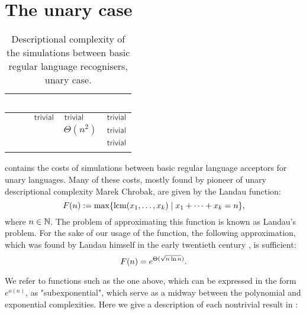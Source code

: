 \section{The unary case}\label{sec:prevsims-unary}

\begin{table}
	\centering
	\renewcommand{\arraystretch}{1.2}
	\begin{tabular}{|l|l|l|p{4.3em}|l|}
		\hline
		~     & \ODFA           & \ONFA           & \TDFA                                            & \TNFA     \\ \hline
		\ODFA & \cY             & $\Cctriv$       & $\Cctriv$                                        & $\Cctriv$ \\ \hline
		\ONFA & \rbt{$\CsubEq$} & \cY             & \cR $\Theta(n^2)$                                & $\Cctriv$ \\ \hline
		\TDFA & \rbt{$\CsubEq$} & \rbt{$\CsubEq$} & \cY                                              & $\Cctriv$ \\ \hline
		\TNFA & \rbt{$\CsubEq$} & \rbt{$\CsubEq$} & \cR \rbt[.4]{$\le\Csubln$} \rbt[.3]{$\ge\Cpoly$} & \cY       \\ \hline
	\end{tabular}
	\caption{Descriptional complexity of the simulations between basic regular language recognisers, unary case.}
	\label{tab:sims-core-unary}
\end{table}

 contains the costs of simulations between basic regular language acceptors for unary languages.
Many of these costs, mostly found by pioneer of unary descriptional complexity Marek Chrobak, are given by the Landau function:
\begin{equation}
	F(n) := \max\{\operatorname{lcm}(x_1,\dots,x_k)\mid x_1+\dots+x_k=n\} \text,
\end{equation}
where $n\in\mathbb N$.
The problem of approximating this function is known as Landau's problem.
For the sake of our usage of the function, the following approximation, which was found by Landau himself in the early twentieth century \cite{Lan03,Lan09}, is sufficient:
\begin{equation}
	F(n) = e^{\Theta(\sqrt{n\ln n})} \text.
\end{equation}

We refer to functions such as the one above, which can be expressed in the form $e^{o(n)}$, as "subexponential", which serve as a midway between the polynomial and exponential complexities.
Here we give a description of each nontrivial result in :

